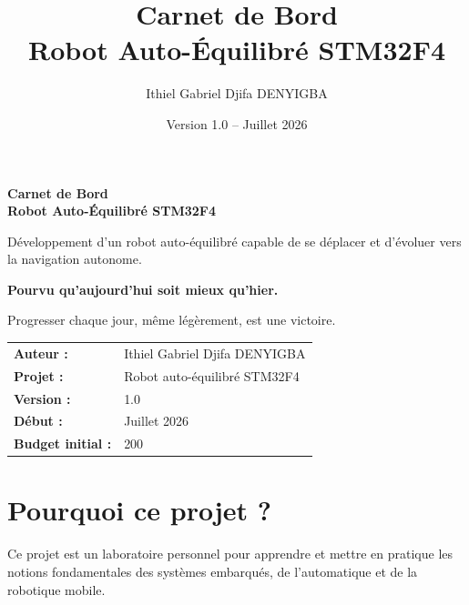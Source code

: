 \documentclass[11pt,a4paper]{article}
\title{\textbf{Carnet de Bord\\Robot Auto-Équilibré STM32F4}}
\author{Ithiel Gabriel Djifa DENYIGBA}
\date{Version 1.0 -- Juillet 2026}
\begin{document}
	
	\begin{titlepage}
		\centering
		\vspace*{2cm}
		
		{\Huge\bfseries\color{myblue} Carnet de Bord\\[0.3cm] Robot Auto-Équilibré STM32F4\par}
		
		\vspace{1.2cm}
		
		{\Large Développement d'un robot auto-équilibré capable de se déplacer et d'évoluer vers la navigation autonome.\par}
		
		\vspace{1.5cm}
		
		\begin{motivation}
			\centering
			\Large\textbf{Pourvu qu'aujourd'hui soit mieux qu'hier.}
			
			\vspace{0.3cm}
			Progresser chaque jour, même légèrement, est une victoire.
		\end{motivation}
		
		\vfill
		
		\begin{tabular}{>{\bfseries}l l}
			Auteur : & Ithiel Gabriel Djifa DENYIGBA \\
			Projet : & Robot auto-équilibré STM32F4 \\
			Version : & 1.0 \\
			Début : & Juillet 2026 \\
			Budget initial : & 200~\texteuro{} \\
		\end{tabular}
		
		\vspace{2cm}
	\end{titlepage}
	
	\tableofcontents
	\newpage
	
	\section{Pourquoi ce projet ?}
	
	Ce projet est un laboratoire personnel pour apprendre et mettre en pratique les notions fondamentales des systèmes embarqués, de l'automatique et de la robotique mobile.
	
\end{document}
